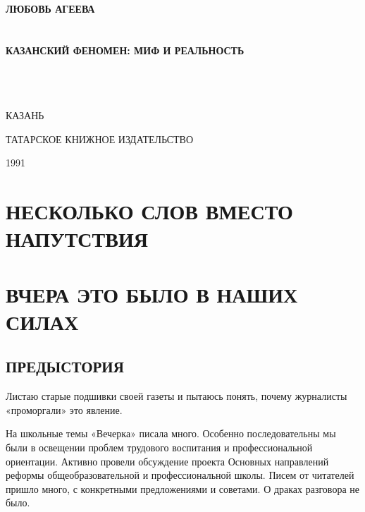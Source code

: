 \documentclass[12pt, a4paper, openany]{book}
\begin{document}
	
	\begin{titlepage}
		
		\begin{center}

			\vspace*{\fill}
			
			
			{\large\bf ЛЮБОВЬ АГЕЕВА\\}
			\ \\
			\ \\
			{\Huge\bf КАЗАНСКИЙ ФЕНОМЕН: МИФ И РЕАЛЬНОСТЬ\\}
			\ \\
			\ \\
			\ \\
			\vspace*{\fill}
			
			\vfill
			

			
			КАЗАНЬ
			
			ТАТАРСКОЕ КНИЖНОЕ ИЗДАТЕЛЬСТВО
			
			1991

		\end{center}
		
	\end{titlepage}
	
	\thispagestyle{empty} %
	
	\newpage
	

\setcounter{secnumdepth}{0}

	\section[Несколько слов вместо напутствия]{\center \textbf{НЕСКОЛЬКО СЛОВ ВМЕСТО НАПУТСТВИЯ}}
	
	\newpage
	
	\section[Вчера это было в наших силах]{\center \textbf{ВЧЕРА ЭТО БЫЛО В НАШИХ СИЛАХ}}
	
	\subsection[Предыстория]{\center \textbf{ПРЕДЫСТОРИЯ}}

Листаю старые подшивки своей газеты и пытаюсь понять, почему журналисты «проморгали» это явление.

На школьные темы «Вечерка» писала много. Осо­бенно последовательны мы были в освещении проблем трудового воспитания и профессиональной ориентации. Активно провели обсуждение проекта Основных направ­лений реформы общеобразовательной и профессиональ­ной школы. Писем от читателей пришло много, с кон­кретными предложениями и советами. О драках раз­говора не было.
\end{document}
